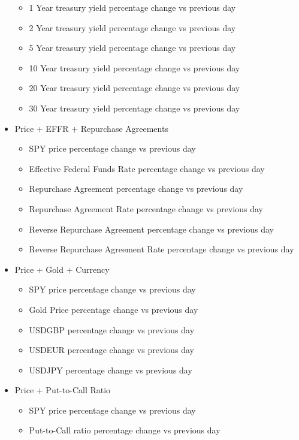 \begin{itemize}
\begin{itemize}
        \item 1 Year treasury yield percentage change vs previous day
        \item 2 Year treasury yield percentage change vs previous day
        \item 5 Year treasury yield percentage change vs previous day
        \item 10 Year treasury yield percentage change vs previous day
        \item 20 Year treasury yield percentage change vs previous day
        \item 30 Year treasury yield percentage change vs previous day
    \end{itemize}
    \item Price + EFFR + Repurchase Agreements
    \begin{itemize}
        \item SPY price percentage change vs previous day
        \item Effective Federal Funds Rate percentage change vs previous day
        \item Repurchase Agreement percentage change vs previous day
        \item Repurchase Agreement Rate percentage change vs previous day
        \item Reverse Repurchase Agreement percentage change vs previous day
        \item Reverse Repurchase Agreement Rate percentage change vs previous day
    \end{itemize}
    \item Price + Gold + Currency
    \begin{itemize}
        \item SPY price percentage change vs previous day
        \item Gold Price percentage change vs previous day
        \item USDGBP percentage change vs previous day
        \item USDEUR percentage change vs previous day
        \item USDJPY percentage change vs previous day
    \end{itemize}
    \item Price + Put-to-Call Ratio
    \begin{itemize}
        \item SPY price percentage change vs previous day
        \item Put-to-Call ratio percentage change vs previous day

\end{itemize}
\end{itemize}
